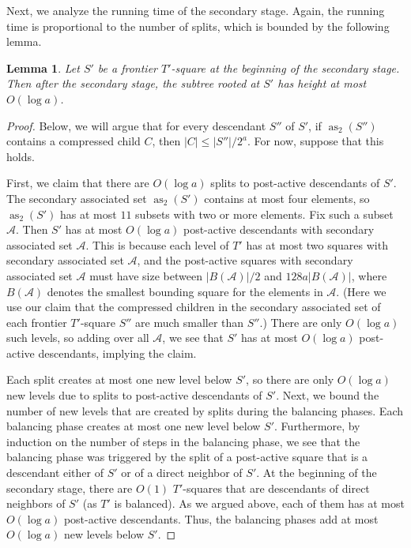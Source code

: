 \documentclass[11pt]{paper}
\DeclareMathOperator {\as}{as}
\newtheorem {lem}[theorem] {Lemma}
\begin{document}
      Next, we analyze the running time of the secondary stage. Again,
      the running time is proportional to the number of splits, which
      is bounded by the following lemma.

      \begin{lem}\label{lem:secondary-bound}
         Let $S'$ be a frontier $T'$-square at the beginning of the
	 secondary stage. Then after the secondary stage, the subtree
	 rooted at $S'$ has height at most $O(\log a)$.
      \end{lem}
      \begin{proof}
      Below, we will argue that for every descendant $S''$ of $S'$,
      if $\as_2(S'')$ contains a compressed child $C$, then
      $|C| \leq |S''|/2^a$. For now, suppose that this holds.

      First, we claim that there are $O(\log a)$ splits
      to post-active descendants of $S'$. 
      The secondary associated set $\as_2(S')$ contains at most four 
      elements, so $\as_2(S')$ has at most $11$ subsets with
      two or more elements. Fix such a subset $\mathcal{A}$.
      Then $S'$ has at most $O(\log a)$ post-active
      descendants with secondary associated set $\mathcal{A}$.
      This is because each level of $T'$ has at most two squares
      with secondary associated set $\mathcal{A}$, and 
      the post-active squares with secondary associated set $\mathcal{A}$
      must have size between $|B(\mathcal{A})|/2$ and 
      $128a|B(\mathcal{A})|$, where $B(\mathcal{A})$ denotes the
      smallest bounding square for the elements in $\mathcal{A}$. 
      (Here we use our claim that the compressed children in
      the secondary associated set of each frontier $T'$-square 
      $S''$ are much smaller
      than $S''$.) There are only $O(\log a)$ such levels, so
      adding over all $\mathcal{A}$, we see that $S'$ has 
      at most $O(\log a)$ post-active descendants, implying the
      claim.

      Each split creates at most one new level below $S'$,
      so there are only $O(\log a)$ new levels 
      due to splits to post-active descendants of $S'$.
      Next, we bound the number of new levels that are created by
      splits during the balancing phases. Each balancing phase
      creates at most one new level below $S'$.
      Furthermore, by induction on the number of steps in the 
      balancing phase, we see that the balancing phase was
      triggered by the split of a post-active square
      that is a descendant either of $S'$ or of a direct neighbor
      of $S'$.
      At the beginning of the secondary stage, there
      are $O(1)$  $T'$-squares that are descendants of direct 
      neighbors of $S'$ (as $T'$ is balanced). As we argued above, each 
      of them has at most $O(\log a)$ post-active descendants.
      Thus, the balancing phases add at most $O(\log a)$ new levels below
      $S'$.
      

\end{proof}
\end{document}
